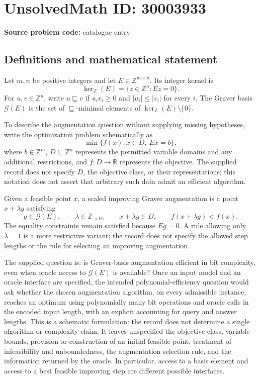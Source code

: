 \documentclass[11pt]{article}
\newcommand{\Z}{\mathbb{Z}}
\newcommand{\R}{\mathbb{R}}
\begin{document}
\section*{UnsolvedMath ID: 30003933}
\textbf{Source problem code:} catalogue entry
\subsection{Definitions and mathematical statement}
Let \(m,n\) be positive integers and let \(E\in\Z^{m\times n}\). Its integer kernel is
\[
\ker_{\Z}(E)=\{z\in\Z^n:Ez=0\}.
\]
For \(u,v\in\Z^n\), write \(u\sqsubseteq v\) if \(u_i v_i\geq 0\) and \(|u_i|\leq |v_i|\) for every \(i\). The Graver basis \(\mathcal G(E)\) is the set of \(\sqsubseteq\)-minimal elements of \(\ker_{\Z}(E)\setminus\{0\}\).

To describe the augmentation question without supplying missing hypotheses, write the optimization problem schematically as
\[
\min\{f(x):x\in D,\ Ex=b\},
\]
where \(b\in\Z^m\), \(D\subseteq\Z^n\) represents the permitted variable domains and any additional restrictions, and \(f:D\to\R\) represents the objective. The supplied record does not specify \(D\), the objective class, or their representations; this notation does not assert that arbitrary such data admit an efficient algorithm.

Given a feasible point \(x\), a scaled improving Graver augmentation is a point \(x+\lambda g\) satisfying
\[
g\in\mathcal G(E),\qquad \lambda\in\Z_{>0},\qquad
x+\lambda g\in D,\qquad f(x+\lambda g)<f(x).
\]
The equality constraints remain satisfied because \(Eg=0\). A rule allowing only \(\lambda=1\) is a more restrictive variant; the record does not specify the allowed step lengths or the rule for selecting an improving augmentation.

The supplied question is: is Graver-basis augmentation efficient in bit complexity, even when oracle access to \(\mathcal G(E)\) is available? Once an input model and an oracle interface are specified, the intended polynomial-efficiency question would ask whether the chosen augmentation algorithm, on every admissible instance, reaches an optimum using polynomially many bit operations and oracle calls in the encoded input length, with an explicit accounting for query and answer lengths. This is a schematic formulation: the record does not determine a single algorithm or complexity claim. It leaves unspecified the objective class, variable bounds, provision or construction of an initial feasible point, treatment of infeasibility and unboundedness, the augmentation selection rule, and the information returned by the oracle. In particular, access to a basis element and access to a best feasible improving step are different possible interfaces.
\end{document}

